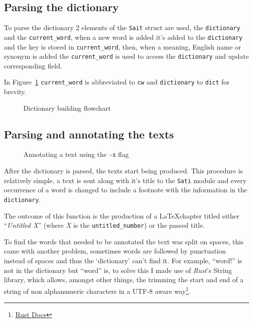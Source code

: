 \documentclass[a4paper]{report}
\begin{document}
\subsection{Parsing the dictionary}\label{ssec:parsing-the-dict}

To parse the dictionary 2 elements of the \texttt{Sait} struct are used, the
\texttt{dictionary} and the \texttt{current\_word}, when a new word is added
it's added to the \texttt{dictionary} and the key is stored in
\texttt{current\_word}, then, when a meaning, English name or synonym is added
the \texttt{current\_word} is used to access the \texttt{dictionary} and update
corresponding field.

In Figure~\ref{fig:flow} \texttt{current\_word} is abbreviated to \texttt{cw}
and \texttt{dictionary} to \texttt{dict} for brevity.

\begin{figure}[H]
    \centering
    
    \caption{Dictionary building flowchart}\label{fig:flow}
\end{figure}

\subsection{Parsing and annotating the texts}

\begin{figure}
    \centering
    
    \caption{Annotating a text using the \texttt{-s} flag}
\end{figure}

After the dictionary is parsed, the texts start being produced. This procedure
is relatively simple, a text is sent along with it's title to the \texttt{Sati}
module and every occurrence of a word is changed to include a footnote with
the information in the \texttt{dictionary}.

The outcome of this function is the production of a \LaTeX chapter titled
either ``\textit{Untitled X}'' (where \textit{X} is the
\texttt{untitled\_number}) or the passed title.

To find the words that needed to be annotated the text was split on spaces,
this came with another problem, sometimes words are followed by punctuation
instead of spaces and thus the `dictionary' can't find it. For example,
``word!'' is not in the dictionary but ``word'' is, to solve this I made use of
\textit{Rust}'s String library, which allows, amongst other things, the
trimming the start and end of a string of non alphanumeric characters in a
UTF-8 aware
way\footnote{\href{https://doc.rust-lang.org/std/primitive.str.html\#method.trim_matches}{Rust Docs}}.
\end{document}
